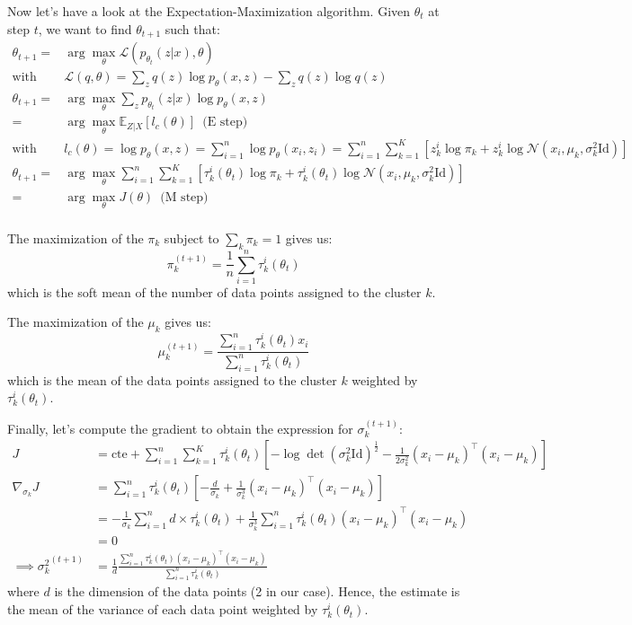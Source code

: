 \documentclass{article}
\begin{document}
Now let's have a look at the Expectation-Maximization algorithm. Given $\theta_t$ at step $t$, we want to find $\theta_{t+1}$ such that:
\begin{align*}
\theta_{t+1} =& \arg \max_\theta \mathcal{L}(p_{\theta_t}(z|x), \theta)\\
\text{with} \,\,& \mathcal{L}(q,\theta) = \sum_z q(z) \log p_\theta(x,z) - \sum_z q(z) \log q(z)\\
\theta_{t+1} =& \arg \max_\theta \sum_z p_{\theta_t}(z|x) \log p_\theta(x,z)\\
=& \arg \max_\theta \mathbb{E}_{Z|X}[l_c(\theta)] \,\,\,\text{(E step)}\\
\text{with} \,\,& l_c(\theta) = \log p_\theta(x,z) =\sum_{i=1}^n \log p_\theta(x_i, z_i) = \sum_{i=1}^n \sum_{k=1}^K \left[ z_k^i \log \pi_k + z_k^i \log \mathcal{N}(x_i, \mu_k, \sigma_k^2 \text{Id}) \right]\\
\theta_{t+1} =& \arg \max_\theta \sum_{i=1}^n \sum_{k=1}^K \left[ \tau_k^i(\theta_t) \log \pi_k + \tau_k^i(\theta_t) \log \mathcal{N}(x_i, \mu_k, \sigma_k^2 \text{Id}) \right]\\
=& \arg \max_\theta J(\theta) \,\,\,\text{(M step)}\\
\end{align*}

The maximization of the $\pi_k$ subject to $\sum_k \pi_k = 1$ gives us:
$$
\pi_k^{(t+1)} = \frac{1}{n} \sum_{i=1}^n \tau_k^i(\theta_t)
$$
which is the soft mean of the number of data points assigned to the cluster $k$.

The maximization of the $\mu_k$ gives us:
$$
\mu_k^{(t+1)} = \frac{\sum_{i=1}^n \tau_k^i(\theta_t) x_i}{\sum_{i=1}^n \tau_k^i(\theta_t)}
$$
which is the mean of the data points assigned to the cluster $k$ weighted by $\tau_k^i(\theta_t)$.

Finally, let's compute the gradient to obtain the expression for $\sigma_k^{(t+1)}$:
\begin{align*}
J &= \text{cte} + \sum_{i=1}^n \sum_{k=1}^K \tau_k^i(\theta_t) \left[ -\log \det(\sigma_k^2 \text{Id})^{\frac{1}{2}} - \frac{1}{2\sigma_k^2} (x_i - \mu_k)^\intercal (x_i - \mu_k) \right]\\
\nabla_{\sigma_k} J&= \sum_{i=1}^n \tau_k^i(\theta_t) \left[ -\frac{d}{\sigma_k} + \frac{1}{\sigma_k^3}(x_i - \mu_k)^\intercal (x_i - \mu_k) \right]\\
&= - \frac{1}{\sigma_k} \sum_{i=1}^n d \times \tau_k^i(\theta_t) + \frac{1}{\sigma_k^3} \sum_{i=1}^n \tau_k^i(\theta_t)(x_i - \mu_k)^\intercal (x_i - \mu_k)\\
&= 0\\
\implies {\sigma_k^2}^{(t+1)} &= \frac{1}{d}\frac{\sum_{i=1}^n \tau_k^i(\theta_t)(x_i - \mu_k)^\intercal (x_i - \mu_k)}{\sum_{i=1}^n \tau_k^i(\theta_t)}
\end{align*}
where $d$ is the dimension of the data points (2 in our case). Hence, the estimate is the mean of the variance of each data point weighted by $\tau_k^i(\theta_t)$.\newline
\end{document}
